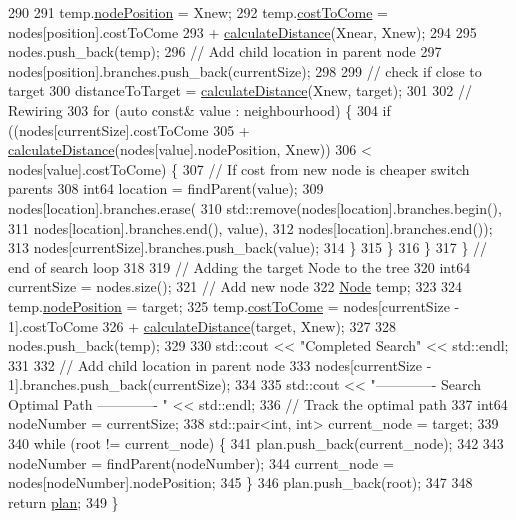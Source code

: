 \begin{DoxyCode}
290 
291       temp.\hyperlink{classNode_a9d7c1d9729c5e196ccf79ef026ce07bb}{nodePosition} = Xnew;
292       temp.\hyperlink{classNode_a4e05c65e3c90bddfaa1f2b24ee06949f}{costToCome} = nodes[position].costToCome
293           + \hyperlink{classRRTStarPlanner_adccd56a0d89c7691a6d844452c077242}{calculateDistance}(Xnear, Xnew);
294 
295       nodes.push\_back(temp);
296       \textcolor{comment}{// Add child location in parent node}
297       nodes[position].branches.push\_back(currentSize);
298 
299       \textcolor{comment}{// check if close to target}
300       distanceToTarget = \hyperlink{classRRTStarPlanner_adccd56a0d89c7691a6d844452c077242}{calculateDistance}(Xnew, target);
301 
302       \textcolor{comment}{// Rewiring}
303       \textcolor{keywordflow}{for} (\textcolor{keyword}{auto} \textcolor{keyword}{const}& value : neighbourhood) \{
304         \textcolor{keywordflow}{if} ((nodes[currentSize].costToCome
305             + \hyperlink{classRRTStarPlanner_adccd56a0d89c7691a6d844452c077242}{calculateDistance}(nodes[value].nodePosition, Xnew))
306             < nodes[value].costToCome) \{
307           \textcolor{comment}{// If cost from new node is cheaper switch parents}
308           int64 location = findParent(value);
309           nodes[location].branches.erase(
310               std::remove(nodes[location].branches.begin(),
311                           nodes[location].branches.end(), value),
312               nodes[location].branches.end());
313           nodes[currentSize].branches.push\_back(value);
314         \}
315       \}
316     \}
317   \}  \textcolor{comment}{// end of search loop}
318 
319   \textcolor{comment}{// Adding the target Node to the tree}
320   int64 currentSize = nodes.size();
321   \textcolor{comment}{// Add new node}
322   \hyperlink{classNode}{Node} temp;
323 
324   temp.\hyperlink{classNode_a9d7c1d9729c5e196ccf79ef026ce07bb}{nodePosition} = target;
325   temp.\hyperlink{classNode_a4e05c65e3c90bddfaa1f2b24ee06949f}{costToCome} = nodes[currentSize - 1].costToCome
326       + \hyperlink{classRRTStarPlanner_adccd56a0d89c7691a6d844452c077242}{calculateDistance}(target, Xnew);
327 
328   nodes.push\_back(temp);
329 
330   std::cout << \textcolor{stringliteral}{"Completed Search"} << std::endl;
331 
332   \textcolor{comment}{// Add child location in parent node}
333   nodes[currentSize - 1].branches.push\_back(currentSize);
334 
335   std::cout << \textcolor{stringliteral}{"------------- Search Optimal Path ------------- "} << std::endl;
336   \textcolor{comment}{// Track the optimal path}
337   int64 nodeNumber = currentSize;
338   std::pair<int, int> current\_node = target;
339 
340   \textcolor{keywordflow}{while} (root != current\_node) \{
341     plan.push\_back(current\_node);
342 
343     nodeNumber = findParent(nodeNumber);
344     current\_node = nodes[nodeNumber].nodePosition;
345   \}
346   plan.push\_back(root);
347 
348   \textcolor{keywordflow}{return} \hyperlink{classRRTStarPlanner_afee7f772c5ff1372b21da124b9818b23}{plan};
349 \}
\end{DoxyCode}
